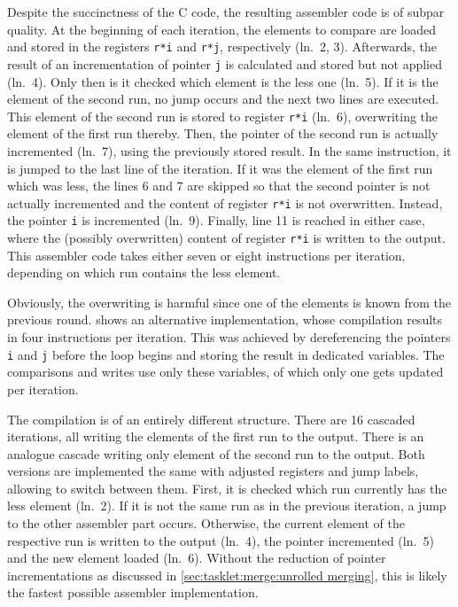 Despite the succinctness of the C code, the resulting assembler code is of subpar quality.
At the beginning of each iteration, the elements to compare are loaded and stored in the registers \lstinline|r*i| and \lstinline|r*j|, respectively (ln.~2, 3).
Afterwards, the result of an incrementation of pointer \lstinline|j| is calculated and stored but not applied (ln.~4).
Only then is it checked which element is the less one (ln.~5).
If it is the element of the second run, no jump occurs and the next two lines are executed.
This element of the second run is stored to register \lstinline|r*i| (ln.~6), overwriting the element of the first run thereby.
Then, the pointer of the second run is actually incremented (ln.~7), using the previously stored result.
In the same instruction, it is jumped to the last line of the iteration.
If it was the element of the first run which was less, the lines 6 and 7 are skipped so that the second pointer is not actually incremented and the content of register \lstinline|r*i| is not overwritten.
Instead, the pointer \lstinline|i| is incremented (ln.~9).
Finally, line 11 is reached in either case, where the (possibly overwritten) content of register \lstinline|r*i| is written to the output.
This assembler code takes either seven or eight instructions per iteration, depending on which run contains the less element.

Obviously, the overwriting is harmful since one of the elements is known from the previous round.
 shows an alternative implementation, whose compilation results in four instructions per iteration.
This was achieved by dereferencing the pointers \lstinline|i| and \lstinline|j| before the loop begins and storing the result in dedicated variables.
The comparisons and writes use only these variables, of which only one gets updated per iteration.

The compilation is of an entirely different structure.
There are 16 cascaded iterations, all writing the elements of the first run to the output.
There is an analogue cascade writing only element of the second run to the output.
Both versions are implemented the same with adjusted registers and jump labels, allowing to switch between them.
First, it is checked which run currently has the less element (ln.~2).
If it is not the same run as in the previous iteration, a jump to the other assembler part occurs.
Otherwise, the current element of the respective run is written to the output (ln.~4), the pointer incremented (ln.~5) and the new element loaded (ln.~6).
Without the reduction of pointer incrementations as discussed in \cref{sec:tasklet:merge:unrolled merging}, this is likely the fastest possible assembler implementation.

